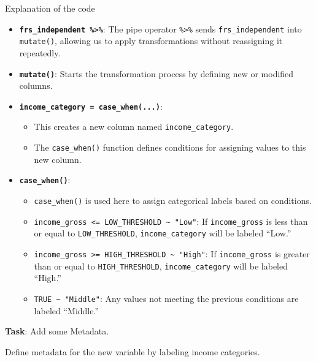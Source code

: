 \documentclass[
  letterpaper,
  DIV=11,
  numbers=noendperiod]{scrreprt}
\providecommand{\tightlist}{%
  \setlength{\itemsep}{0pt}\setlength{\parskip}{0pt}}\usepackage{longtable,booktabs,array}
\begin{document}
Explanation of the code

\begin{itemize}
\tightlist
\item
  \textbf{\texttt{frs\_independent\ \%\textgreater{}\%}}: The pipe
  operator \texttt{\%\textgreater{}\%} sends \texttt{frs\_independent}
  into \texttt{mutate()}, allowing us to apply transformations without
  reassigning it repeatedly.
\item
  \textbf{\texttt{mutate()}}: Starts the transformation process by
  defining new or modified columns.
\item
  \textbf{\texttt{income\_category\ =\ case\_when(...)}}:

  \begin{itemize}
  \tightlist
  \item
    This creates a new column named \texttt{income\_category}.
  \item
    The \texttt{case\_when()} function defines conditions for assigning
    values to this new column.
  \end{itemize}
\item
  \textbf{\texttt{case\_when()}}:

  \begin{itemize}
  \tightlist
  \item
    \texttt{case\_when()} is used here to assign categorical labels
    based on conditions.
  \item
    \texttt{income\_gross\ \textless{}=\ LOW\_THRESHOLD\ \textasciitilde{}\ "Low"}:
    If \texttt{income\_gross} is less than or equal to
    \texttt{LOW\_THRESHOLD}, \texttt{income\_category} will be labeled
    ``Low.''
  \item
    \texttt{income\_gross\ \textgreater{}=\ HIGH\_THRESHOLD\ \textasciitilde{}\ "High"}:
    If \texttt{income\_gross} is greater than or equal to
    \texttt{HIGH\_THRESHOLD}, \texttt{income\_category} will be labeled
    ``High.''
  \item
    \texttt{TRUE\ \textasciitilde{}\ "Middle"}: Any values not meeting
    the previous conditions are labeled ``Middle.''
  \end{itemize}
\end{itemize}

\textbf{Task}: Add some Metadata.

Define metadata for the new variable by labeling income categories.
\end{document}
